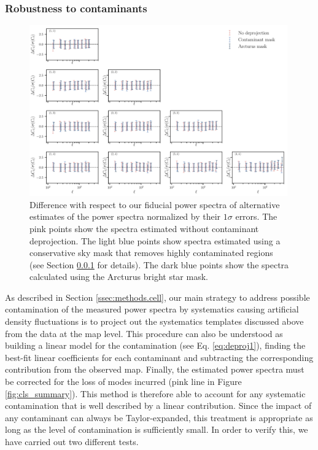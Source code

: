 \documentclass[a4paper,11pt]{article}
\begin{document}
    \subsubsection{Robustness to contaminants} \label{sssec:results.spectra.syst}
      \begin{figure}
        \centering
        \includegraphics[width=0.99\textwidth]{figures/cls_systematics.pdf}
        \caption{Difference with respect to our fiducial power spectra of alternative estimates of the power spectra normalized by their $1\sigma$ errors. The pink points show the spectra estimated without contaminant deprojection. The light blue points show spectra estimated using a conservative sky mask that removes highly contaminated regions (see Section \ref{sssec:results.spectra.syst} for details). The dark blue points show the spectra calculated using the Arcturus bright star mask.}
        \label{fig:cls_systematics}
      \end{figure}
      As described in Section \ref{ssec:methods.cell}, our main strategy to address possible contamination of the measured power spectra by systematics causing artificial density fluctuations is to project out the systematics templates discussed above from the data at the map level. This procedure can also be understood as building a linear model for the contamination (see Eq. \ref{eq:deproj1}), finding the best-fit linear coefficients for each contaminant and subtracting the corresponding contribution from the observed map. Finally, the estimated power spectra must be corrected for the loss of modes incurred (pink line in Figure \ref{fig:cls_summary}). This method is therefore able to account for any systematic contamination that is well described by a linear contribution. Since the impact of any contaminant can always be Taylor-expanded, this treatment is appropriate as long as the level of contamination is sufficiently small. In order to verify this, we have carried out two different tests.
      
\end{document}

